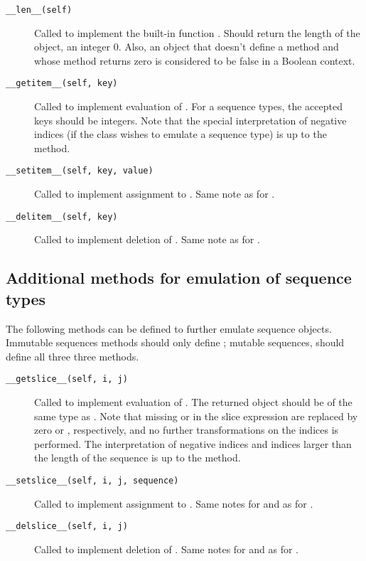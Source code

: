 \begin{description}

\item[{\tt __len__(self)}]
Called to implement the built-in function .  Should return
the length of the object, an integer \code{>=} 0.  Also, an object
that doesn't define a  method and
whose  method returns zero is considered to be false in a
Boolean context.

\item[{\tt __getitem__(self, key)}]
Called to implement evaluation of .
For a sequence types, the accepted keys should be integers.  Note that the
special interpretation of negative indices (if the class wishes to
emulate a sequence type) is up to the  method.

\item[{\tt __setitem__(self, key, value)}]
Called to implement assignment to .  Same note as for
.

\item[{\tt __delitem__(self, key)}]
Called to implement deletion of .  Same note as for
.

\end{description}


\subsection{Additional methods for emulation of sequence types%
  \label{sequence-methods}}

The following methods can be defined to further emulate sequence
objects.  Immutable sequences methods should only define
; mutable sequences, should define all three
three methods.

\begin{description}

\item[{\tt __getslice__(self, i, j)}]
Called to implement evaluation of .  The returned
object should be of the same type as .  Note that missing
 or  in the slice expression are replaced by zero or
, respectively, and no further transformations on the
indices is performed.  The interpretation of negative indices and
indices larger than the length of the sequence is up to the method.

\item[{\tt __setslice__(self, i, j, sequence)}]
Called to implement assignment to .  Same notes for
 and  as for .

\item[{\tt __delslice__(self, i, j)}]
Called to implement deletion of .  Same notes for
 and  as for .

\end{description}

